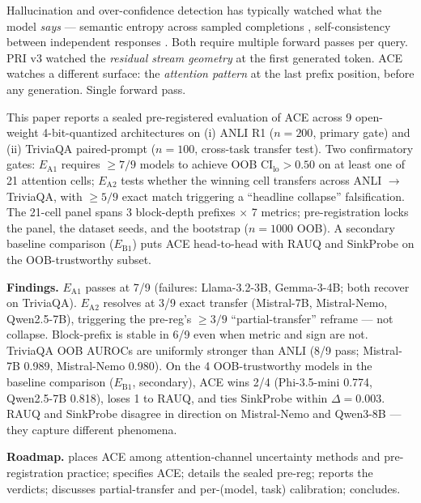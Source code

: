 \documentclass[10pt, letterpaper]{article}
\newcommand{\ea}[1]{$E_{\text{A}#1}$}
\newcommand{\eb}[1]{$E_{\text{B}#1}$}
\begin{document}
Hallucination and over-confidence detection has typically watched what
the model \emph{says} --- semantic entropy across sampled completions
\citep{farquhar2024semantic}, self-consistency between independent
responses \citep{wastl2025token}. Both require multiple forward passes
per query. PRI v3 \citep{kitti2026pri} watched the
\emph{residual stream geometry} at the first generated token. ACE
watches a different surface: the \emph{attention pattern} at the last
prefix position, before any generation. Single forward pass.

This paper reports a sealed pre-registered evaluation of ACE across 9
open-weight 4-bit-quantized architectures on (i) ANLI R1 ($n{=}200$,
primary gate) and (ii) TriviaQA paired-prompt ($n{=}100$, cross-task
transfer test). Two confirmatory gates: \ea{1} requires $\geq 7/9$
models to achieve OOB $\text{CI}_{\text{lo}} > 0.50$ on at least one
of 21 attention cells; \ea{2} tests whether the winning cell transfers
across ANLI $\to$ TriviaQA, with $\geq 5/9$ exact match triggering a
``headline collapse'' falsification. The 21-cell panel spans 3
block-depth prefixes $\times$ 7 metrics; pre-registration locks the
panel, the dataset seeds, and the bootstrap ($n{=}1000$ OOB). A
secondary baseline comparison (\eb{1}) puts ACE head-to-head with
RAUQ \citep{rauq2026anonymous} and SinkProbe
\citep{binkowski2026sinkprobe} on the OOB-trustworthy subset.

\textbf{Findings.} \ea{1} passes at 7/9 (failures: Llama-3.2-3B,
Gemma-3-4B; both recover on TriviaQA). \ea{2} resolves at 3/9 exact
transfer (Mistral-7B, Mistral-Nemo, Qwen2.5-7B), triggering the
pre-reg's $\geq 3/9$ ``partial-transfer'' reframe --- not collapse.
Block-prefix is stable in 6/9 even when metric and sign are not.
TriviaQA OOB AUROCs are uniformly stronger than ANLI (8/9 pass;
Mistral-7B 0.989, Mistral-Nemo 0.980). On the 4 OOB-trustworthy
models in the baseline comparison (\eb{1}, secondary), ACE wins 2/4
(Phi-3.5-mini 0.774, Qwen2.5-7B 0.818), loses 1 to RAUQ, and ties
SinkProbe within $\Delta=0.003$. RAUQ and SinkProbe disagree in
direction on Mistral-Nemo and Qwen3-8B --- they capture different
phenomena.

\textbf{Roadmap.}  places ACE among attention-channel
uncertainty methods and pre-registration practice; 
specifies ACE;  details the sealed pre-reg;
 reports the verdicts; 
discusses partial-transfer and per-(model, task) calibration;
 concludes.
\end{document}
